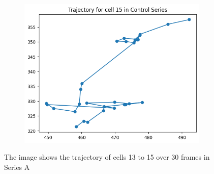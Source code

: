 \documentclass{article}
\begin{document}
\begin{figure}[h!]
    \begin{subfigure}[b]{0.5\linewidth}
        \centering
        \includegraphics[width=\linewidth]{Report/Appendix_Images/Trajectory-A-Control/trajectory_15.png}
        \caption{}
    \end{subfigure}
    \caption{The image shows the trajectory of cells 13 to 15 over 30 frames in Series A}
    \label{fig:ChoiceofCells-ControlSeries}
\end{figure}




\end{document}
